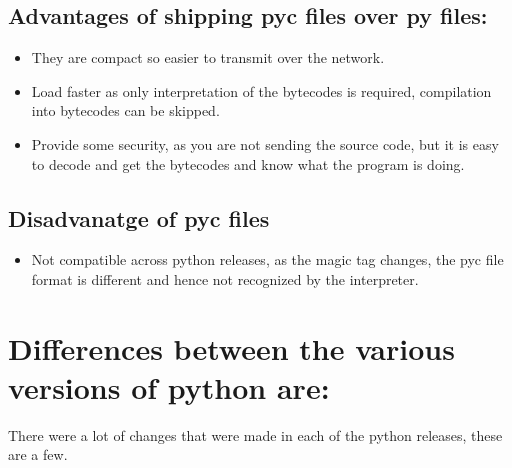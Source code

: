 \documentclass[letterpaper,10pt,dutch]{sphinxmanual}
\begin{document}
\section{Advantages of shipping pyc files over py files:}
\label{index:advantages-of-shipping-pyc-files-over-py-files}\begin{itemize}
\item {} 
They are compact so easier to transmit over the network.

\item {} 
Load faster as only interpretation of the bytecodes is required, compilation into bytecodes can be skipped.

\item {} 
Provide some security, as you are not sending the source code, but it is easy to decode and get the bytecodes and know what the program is doing.

\end{itemize}


\section{Disadvanatge of pyc files}
\label{index:disadvanatge-of-pyc-files}\begin{itemize}
\item {} 
Not compatible across python releases, as the magic tag changes, the pyc file format is different and hence not recognized by the interpreter.

\end{itemize}


\chapter{Differences between the various versions of python are:}
\label{index:differences-between-the-various-versions-of-python-are}
There were a lot of changes that were made in each of the python releases, these are a few.
\end{document}
